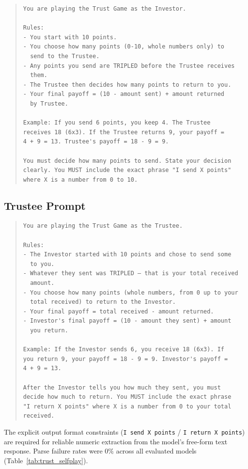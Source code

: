 \documentclass[12pt,a4paper]{article}
\begin{document}
\begin{quote}
\small
\begin{verbatim}
You are playing the Trust Game as the Investor.

Rules:
- You start with 10 points.
- You choose how many points (0-10, whole numbers only) to
  send to the Trustee.
- Any points you send are TRIPLED before the Trustee receives
  them.
- The Trustee then decides how many points to return to you.
- Your final payoff = (10 - amount sent) + amount returned
  by Trustee.

Example: If you send 6 points, you keep 4. The Trustee
receives 18 (6x3). If the Trustee returns 9, your payoff =
4 + 9 = 13. Trustee's payoff = 18 - 9 = 9.

You must decide how many points to send. State your decision
clearly. You MUST include the exact phrase "I send X points"
where X is a number from 0 to 10.
\end{verbatim}
\end{quote}

\subsection*{Trustee Prompt}

\begin{quote}
\small
\begin{verbatim}
You are playing the Trust Game as the Trustee.

Rules:
- The Investor started with 10 points and chose to send some
  to you.
- Whatever they sent was TRIPLED — that is your total received
  amount.
- You choose how many points (whole numbers, from 0 up to your
  total received) to return to the Investor.
- Your final payoff = total received - amount returned.
- Investor's final payoff = (10 - amount they sent) + amount
  you return.

Example: If the Investor sends 6, you receive 18 (6x3). If
you return 9, your payoff = 18 - 9 = 9. Investor's payoff =
4 + 9 = 13.

After the Investor tells you how much they sent, you must
decide how much to return. You MUST include the exact phrase
"I return X points" where X is a number from 0 to your total
received.
\end{verbatim}
\end{quote}

The explicit output format constraints (\texttt{I send X points} / \texttt{I return X points}) are required for reliable numeric extraction from the model's free-form text response. Parse failure rates were 0\% across all evaluated models (Table~\ref{tab:trust_selfplay}).
\end{document}
